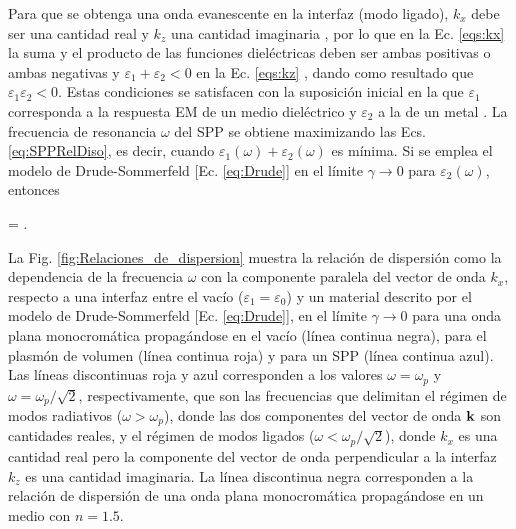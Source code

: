 Para que se obtenga una onda evanescente en la interfaz (modo ligado), $k_x$ debe ser una cantidad real y $k_z$ una cantidad imaginaria \cite{novotny2006principles}, por lo que en la Ec. \eqref{eqs:kx} la suma y el producto de las funciones dieléctricas deben ser ambas positivas o ambas negativas y $\varepsilon_1+\varepsilon_2<0$ en la Ec. \eqref{eqs:kz} \cite{novotny2006principles}, dando como resultado que $\varepsilon_1\varepsilon_2<0$. Estas condiciones se satisfacen con la suposición inicial en la que $\varepsilon_1$ corresponda a la respuesta EM de un medio dieléctrico y $\varepsilon_2$ a la de un metal \cite{novotny2006principles,maier2007plasmonics}. La frecuencia de resonancia $\omega$ del SPP se obtiene maximizando las Ecs. \eqref{eq:SPPRelDiso}, es decir, cuando $\varepsilon_1(\omega)+\varepsilon_2(\omega)$ es mínima. Si se emplea el modelo de Drude-Sommerfeld [Ec. \eqref{eq:Drude}] en el límite $\gamma\to 0$ para $\varepsilon_2(\omega)$, entonces \cite{maier2007plasmonics}  \vspace*{-.75em}
	\begin{tcolorbox}[title =Frecuencia de resonancia del SPP, ams align,  breakable ]
	\omega = .
	\end{tcolorbox}\vspace*{-.75em}\noindent

La Fig. \ref{fig:Relaciones_de_dispersion} muestra la relación de dispersión como la dependencia de la frecuencia $\omega$ con la componente paralela del vector de onda $k_x$, respecto a una interfaz entre el vacío ($\varepsilon_1=\varepsilon_0$) y un material descrito por el modelo de Drude-Sommerfeld [Ec. \eqref{eq:Drude}], en el límite $\gamma\to 0$ para una onda plana monocromática propagándose en el vacío (línea continua negra), para el plasmón de volumen (línea continua roja) y para un SPP (línea continua azul). Las líneas discontinuas roja y azul corresponden a los valores $\omega=\omega_p$ y $\omega=\omega_p/\sqrt{2}$, respectivamente, que son las frecuencias que delimitan el régimen de modos radiativos ($\omega>\omega_p$), donde las dos componentes del vector de onda $\vb{k}$ son cantidades reales, y el régimen de modos ligados ($\omega<\omega_p/\sqrt{2}$), donde $k_x$ es una cantidad real pero la componente del vector de onda perpendicular a la interfaz $k_z$ es una cantidad imaginaria. La línea discontinua negra corresponden a la relación de dispersión de una onda plana monocromática propagándose  en un medio con $n=1.5$.

